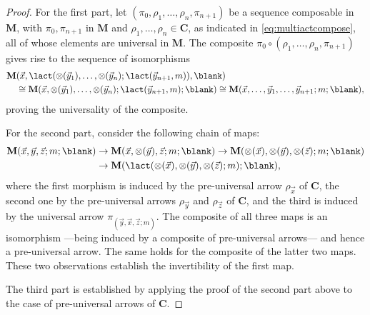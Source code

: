 \begin{proof}
  For the first part, let \((\pi_{0}, \rho_{1},\ldots, \rho_{n}, \pi_{n+1})\) be a sequence composable in \(\mathbf{M}\),
  with \(\pi_{0},\pi_{n+1}\) in \(\mathbf{M}\) and \(\rho_{1},\ldots, \rho_{n} \in \mathbf{C}\),
  as indicated in \cref{eq:multiactcompose},
  all of whose elements are universal in \(\mathbf{M}\).
  The composite \(\pi_{0} \circ (\rho_{1},\ldots, \rho_{n}, \pi_{n+1})\) gives rise to the sequence of isomorphisms
  \[
    \begin{aligned}
      \mathbf{M}&(\vec{x}, \lact(\otimes(\vec{y}_{1}),\ldots, \otimes(\vec{y}_{n});\lact(\vec{y}_{n+1},m)),\blank) \\
                  &\cong \mathbf{M}(\vec{x}, \otimes(\vec{y}_{1}), \ldots, \otimes(\vec{y}_{n});\lact(\vec{y}_{n+1},m);\blank)
                \cong \mathbf{M}(\vec{x},\ldots, \vec{y}_{1},\ldots,\vec{y}_{n+1};m;\blank),
    \end{aligned}
  \]
  proving the universality of the composite.

  For the second part, consider the following chain of maps:
  \begin{align*}
    \mathbf{M}(\vec{x},\vec{y},\vec{z};m;\blank)
    & \rightarrow \mathbf{M}(\vec{x},\otimes(\vec{y}),\vec{z};m;\blank)
      \rightarrow \mathbf{M}(\otimes(\vec{x}),\otimes(\vec{y}),\otimes(\vec{z});m;\blank) \\
    & \rightarrow \mathbf{M}(\lact(\otimes(\vec{x}),\otimes(\vec{y}),\otimes(\vec{z});m);\blank),
  \end{align*}
  where the first morphism is induced by the pre-universal arrow \(\rho_{\vec{x}}\) of \(\mathbf{C}\),
  the second one by the pre-universal arrows \(\rho_{\vec{y}}\) and \(\rho_{\vec{z}}\) of \(\mathbf{C}\),
  and the third is induced by the universal arrow \(\pi_{(\vec{y},\vec{x},\vec{z}; m)}\).
  The composite of all three maps is an isomorphism%
  —being induced by a composite of pre-universal arrows—%
  and hence a pre-universal arrow.
  The same holds for the composite of the latter two maps.
  These two observations establish the invertibility of the first map.

  The third part is established by applying the proof of the second part above to the case of pre-universal arrows of \(\mathbf{C}\).
\end{proof}

